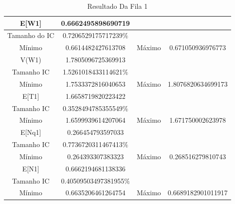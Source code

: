 \documentclass[a4paper,10pt]{article}
\begin{document}
	    \begin{table}[H] 
		  \centering
		  \begin{tabular}{|c|c|c|c|}
		        \hline
			 E[W1]         & 0.6662495898690719     &        &                        \\ \hline
			 Tamanho do IC & 0.7206529175717239$\%$ & 	 &		         \\ \hline
			 Mínimo        & 0.6614482427613708     & Máximo & 0.671050936976773     \\ \hline
			 V(W1)         & 1.7805096725369913     &	 &		         \\ \hline	
			 Tamanho IC    & 1.5261018433114621$\%$ &	 &		         \\ \hline
			 Mínimo        & 1.7533372816040653     & Máximo & 1.8076820634699173	 \\ \hline
			 E[T1]         & 1.6658719820223422     &	 &		         \\ \hline	
			 Tamanho IC    & 0.3528494785355549$\%$ &	 &		         \\ \hline
			 Mínimo        & 1.6599939614207064     & Máximo & 1.671750002623978	 \\ \hline
			 E[Nq1]        & 0.266454793597033      &	 &		         \\ \hline	
			 Tamanho IC    & 0.7736720311467413$\%$ &	 &		         \\ \hline
			 Mínimo        & 0.264393307383323      & Máximo & 0.268516279810743	 \\ \hline
			 E[N1]         & 0.6662194681138336     &	 &		         \\ \hline	
			 Tamanho IC    & 0.40509503497381955$\%$&	 &		         \\ \hline
			 Mínimo        & 0.6635206461264754     & Máximo & 0.6689182901011917	 \\ \hline
		  \end{tabular}
		  \caption{Resultado Da Fila 1} 
	    \end{table}
\end{document}
